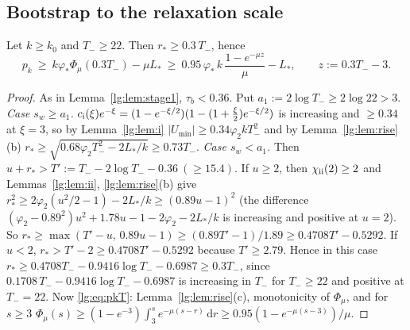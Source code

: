 \subsection{Bootstrap to the relaxation scale}\label{lg:sec:bootstrap}
\begin{lemma}\label{lg:lem:stage2}
Let $k\ge k_0$ and $T_-\ge22$. Then $r_\ast\ge0.3\,T_-$, hence
\begin{equation}\label{lg:eq:pkT}
p_k\ \ge\ k\varphi_\ast\Phi_\mu(0.3T_-)-\mu L_\ast\ \ge\ 0.95\,\varphi_\ast\,k\,\frac{1-e^{-\mu z}}{\mu}-L_\ast,
\qquad z:=0.3T_--3 .
\end{equation}
\end{lemma}
\begin{proof}
As in Lemma~\ref{lg:lem:stage1}, $\tau_b<0.36$. Put $a_1:=2\log T_-\ge2\log22>3$.
\emph{Case $s_w\ge a_1$.} $c_{\rm i}(\xi)e^{-\xi}=(1-e^{-\xi/2})(1-(1+\frac\xi2)e^{-\xi/2})$ is increasing and
$\ge0.34$ at $\xi=3$, so by Lemma~\ref{lg:lem:i} $|U_{\min}|\ge0.34\varphi_2kT_-^2$ and by Lemma~\ref{lg:lem:rise}(b)
$r_\ast\ge\sqrt{0.68\varphi_2T_-^2-2L_\ast/k}\ge0.73T_-$.
\emph{Case $s_w<a_1$.} Then $u+r_\ast>T':=T_--2\log T_--0.36\ (\ge15.4)$. If $u\ge2$, then
$\chi_{\rm ii}(2)\ge2$ and Lemmas~\ref{lg:lem:ii}, \ref{lg:lem:rise}(b) give
$r_\ast^2\ge2\varphi_2(u^2/2-1)-2L_\ast/k\ge(0.89u-1)^2$ (the difference
$(\varphi_2-0.89^2)u^2+1.78u-1-2\varphi_2-2L_\ast/k$ is increasing and positive at $u=2$). So
$r_\ast\ge\max(T'-u,\,0.89u-1)\ge(0.89T'-1)/1.89\ge0.4708T'-0.5292$. If $u<2$,
$r_\ast>T'-2\ge0.4708T'-0.5292$ because $T'\ge2.79$. Hence in this case
$r_\ast\ge0.4708T_--0.9416\log T_--0.6987\ge0.3T_-$, since $0.1708\,T_--0.9416\log T_--0.6987$ is increasing
in $T_-$ for $T_-\ge22$ and positive at $T_-=22$.
Now \eqref{lg:eq:pkT}: Lemma~\ref{lg:lem:rise}(c), monotonicity of $\Phi_\mu$, and for $s\ge3$
$\Phi_\mu(s)\ge(1-e^{-3})\int_3^se^{-\mu(s-r)}\,\mathrm dr\ge0.95(1-e^{-\mu(s-3)})/\mu$.
\end{proof}

